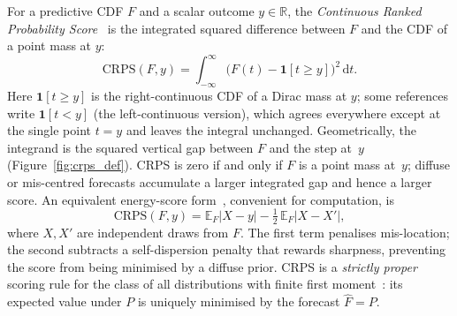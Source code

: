 \documentclass[11pt]{article}
\begin{document}
For a predictive CDF $F$ and a scalar outcome $y \in \mathbb{R}$, the
\emph{Continuous Ranked Probability Score}~\citep{GneitingRaftery2007} is the integrated squared difference
between $F$ and the CDF of a point mass at $y$:
\begin{equation}
  \label{eq:crps-integral}
  \mathrm{CRPS}(F, y)
  = \int_{-\infty}^{\infty} \bigl(F(t) - \mathbf{1}[t \ge y]\bigr)^2\,\mathrm{d}t.
\end{equation}
Here $\mathbf{1}[t \ge y]$ is the right-continuous CDF of a Dirac mass at $y$;
some references write $\mathbf{1}[t < y]$ (the left-continuous version), which
agrees everywhere except at the single point $t = y$ and leaves the integral unchanged.
Geometrically, the integrand is the squared vertical gap between $F$ and the step
at~$y$ (Figure~\ref{fig:crps_def}).
CRPS is zero if and only if $F$ is a point mass at~$y$; diffuse or mis-centred forecasts
accumulate a larger integrated gap and hence a larger score.
An equivalent energy-score form~\cite[Eq.~(21)]{GneitingRaftery2007}, convenient for computation, is
\begin{equation}
  \label{eq:crps-energy}
  \mathrm{CRPS}(F, y)
  = \mathbb{E}_F|X - y| - \tfrac{1}{2}\,\mathbb{E}_F|X - X'|,
\end{equation}
where $X, X'$ are independent draws from $F$.
The first term penalises mis-location; the second subtracts a self-dispersion penalty that
rewards sharpness, preventing the score from being minimised by a diffuse prior.
CRPS is a \emph{strictly proper} scoring rule for the class of all distributions with
finite first moment~\citep{GneitingRaftery2007}: its expected value under $P$ is uniquely
minimised by the forecast $\hat{F} = P$.
\end{document}
